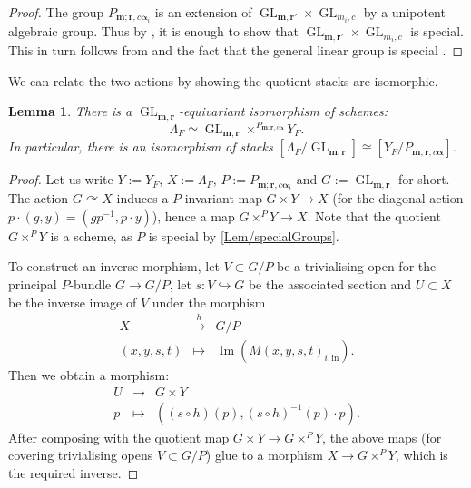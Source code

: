 \documentclass[a4paper,12pt]{article}
\theoremstyle{definition}
\theoremstyle{plain}
\newtheorem{lemma}[definition]{Lemma}
\theoremstyle{remark}
\DeclareMathOperator{\GL}{GL}
\DeclareMathOperator{\Ima}{Im}
\newcommand\bfalpha{\bm{\alpha}}
\newcommand\bfm{\mathbf{m}}
\newcommand\bfr{\mathbf{r}}
\begin{document}
\begin{proof}
The group $P_{\bfm;\bfr,c\bfalpha_i}$ is an extension of $\GL_{\bfm,\bfr'}\times\GL_{m_i,c}$ by a unipotent algebraic group. Thus by \cite[Lem.\ 6, Prop.\ 14]{Ser58}, it is enough to show that $\GL_{\bfm,\bfr'}\times\GL_{m_i,c}$ is special. This in turn follows from \cite[Lem.\ 6, Prop.\ 14]{Ser58} and the fact that the general linear group is special \cite[Lem.\ III.4.10]{Mil80}.
\end{proof}

We can relate the two actions by showing the quotient stacks are isomorphic.

\begin{lemma}\label{Lem/parabolicReduction}
There is a $\GL_{\bfm,\bfr}$-equivariant isomorphism of schemes:
\[
\Lambda_F\simeq \GL_{\bfm,\bfr}\times^{P_{\bfm;\bfr,c\bfalpha}}Y_F.
\]
In particular, there is an isomorphism of stacks $[\Lambda_F/\GL_{\bfm,\bfr}] \cong [ Y_F /P_{\bfm;\bfr,c\bfalpha}]$.
\end{lemma}

\begin{proof}
Let us write $Y:=Y_F$, $X:=\Lambda_F$, $P:=P_{\bfm;\bfr,c\bfalpha_i}$ and $G:=\GL_{\bfm,\bfr}$ for short. The action $G\curvearrowright X$ induces a $P$-invariant map $G\times Y\rightarrow X$ (for the diagonal action $p\cdot (g,y)=(gp^{-1},p\cdot y)$), hence a map $G\times^PY\rightarrow X$. Note that the quotient $G\times^PY$ is a scheme, as $P$ is special by \cref{Lem/specialGroups}. 

To construct an inverse morphism, let $V\subset G/P$ be a trivialising open for the principal $P$-bundle $G\rightarrow G/P$, let $s\colon V\hookrightarrow G$ be the associated section and $U\subset X$ be the inverse image of $V$ under the morphism
\[
\begin{array}{rcl}
 X & \stackrel{h}{\longrightarrow} & G/P \\
(x,y,s,t) & \mapsto & \Ima(M(x,y,s,t)_{i,\mathrm{in}})
.
\end{array}
\]
Then we obtain a morphism:
\[
\begin{array}{rcl}
U & \rightarrow & G\times Y \\
p & \mapsto & \left((s\circ h)(p),(s\circ h)^{-1}(p)\cdot p\right)
.
\end{array}
\]
After composing with the quotient map $G\times Y\rightarrow G\times^PY$, the above maps (for covering trivialising opens $V\subset G/P$) glue to a morphism $X\rightarrow G\times^PY$, which is the required inverse.
\end{proof}
\end{document}

